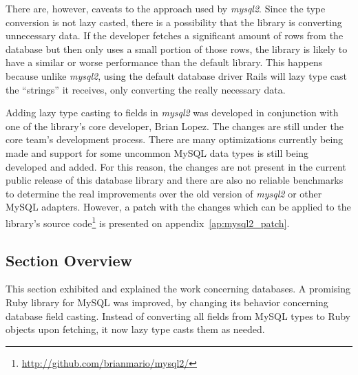 There are, however, caveats to the approach used by \textit{mysql2}. Since the type conversion is not lazy casted, there is a possibility that the library is converting unnecessary data. If the developer fetches a significant amount of rows from the database but then only uses a small portion of those rows, the library is likely to have a similar or worse performance than the default library. This happens because unlike \textit{mysql2}, using the default database driver Rails will lazy type cast the ``strings'' it receives, only converting the really necessary data.

Adding lazy type casting to fields in \textit{mysql2} was developed in conjunction with one of the library's core developer, Brian Lopez. The changes are still under the core team's development process. There are many optimizations currently being made and support for some uncommon MySQL data types is still being developed and added. For this reason, the changes are not present in the current public release of this database library and there are also no reliable benchmarks to determine the real improvements over the old version of \textit{mysql2} or other MySQL adapters. However, a patch with the changes which can be applied to the library's source code\footnote{\url{http://github.com/brianmario/mysql2/}} is presented on appendix~\ref{ap:mysql2_patch}.


\subsection{Section Overview}
This section exhibited and explained the work concerning databases. A promising Ruby library for MySQL was improved, by changing its behavior concerning database field casting. Instead of converting all fields from MySQL types to Ruby objects upon fetching, it now lazy type casts them as needed.

